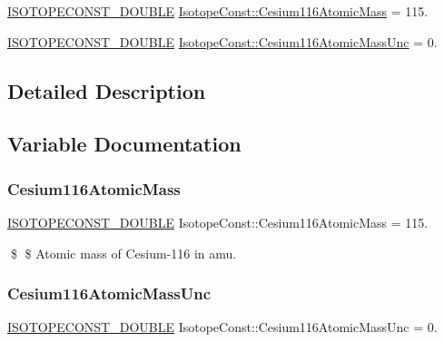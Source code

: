 \begin{DoxyCompactItemize}
\item 
\mbox{\hyperlink{group___isotope_const-_macros_ga8f45a7272ce02c0b4c65c44636ed719a}{I\+S\+O\+T\+O\+P\+E\+C\+O\+N\+S\+T\+\_\+\+D\+O\+U\+B\+LE}} \mbox{\hyperlink{group___isotope_const-_cesium-_cs116_ga8b0d0c7e9a9b6ee02d82022975bf0cca}{Isotope\+Const\+::\+Cesium116\+Atomic\+Mass}} = 115.
\item 
\mbox{\hyperlink{group___isotope_const-_macros_ga8f45a7272ce02c0b4c65c44636ed719a}{I\+S\+O\+T\+O\+P\+E\+C\+O\+N\+S\+T\+\_\+\+D\+O\+U\+B\+LE}} \mbox{\hyperlink{group___isotope_const-_cesium-_cs116_ga729e89fa2295b584ea350c4cee616564}{Isotope\+Const\+::\+Cesium116\+Atomic\+Mass\+Unc}} = 0.
\end{DoxyCompactItemize}


\subsection{Detailed Description}


\subsection{Variable Documentation}
\mbox{\label{group___isotope_const-_cesium-_cs116_ga8b0d0c7e9a9b6ee02d82022975bf0cca}} 
\subsubsection{\texorpdfstring{Cesium116\+Atomic\+Mass}{Cesium116AtomicMass}}
{\footnotesize\ttfamily \mbox{\hyperlink{group___isotope_const-_macros_ga8f45a7272ce02c0b4c65c44636ed719a}{I\+S\+O\+T\+O\+P\+E\+C\+O\+N\+S\+T\+\_\+\+D\+O\+U\+B\+LE}} Isotope\+Const\+::\+Cesium116\+Atomic\+Mass = 115.}

\$ \$ Atomic mass of Cesium-\/116 in amu. \mbox{\label{group___isotope_const-_cesium-_cs116_ga729e89fa2295b584ea350c4cee616564}} 
\subsubsection{\texorpdfstring{Cesium116\+Atomic\+Mass\+Unc}{Cesium116AtomicMassUnc}}
{\footnotesize\ttfamily \mbox{\hyperlink{group___isotope_const-_macros_ga8f45a7272ce02c0b4c65c44636ed719a}{I\+S\+O\+T\+O\+P\+E\+C\+O\+N\+S\+T\+\_\+\+D\+O\+U\+B\+LE}} Isotope\+Const\+::\+Cesium116\+Atomic\+Mass\+Unc = 0.}

